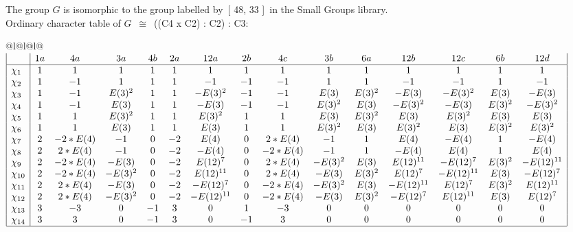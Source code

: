 \documentclass[varwidth=\maxdimen,border=10]{standalone}
\begin{document}
The group $G$ is isomorphic to the group labelled by\ [ 48, 33 ]\ in the Small Groups library.\\
Ordinary character table of $G$\ $\cong$\ ((C4 x C2) : C2) : C3:\\
\begin{center}
\begin{tabular}{@{}l@{}l@{}l@{}}
\hline
\(\begin{array}{|l|cccccccccccccc|}
  & 1a & 4a & 3a & 4b & 2a & 12a & 2b & 4c & 3b & 6a & 12b & 12c & 6b & 12d\\ \hline
\chi_{1} & 1 & 1 & 1 & 1 & 1 & 1 & 1 & 1 & 1 & 1 & 1 & 1 & 1 & 1\\
\chi_{2} & 1 & -1 & 1 & 1 & 1 & -1 & -1 & -1 & 1 & 1 & -1 & -1 & 1 & -1\\
\chi_{3} & 1 & -1 & E(3)^{2} & 1 & 1 & -E(3)^{2} & -1 & -1 & E(3) & E(3)^{2} & -E(3) & -E(3)^{2} & E(3) & -E(3)\\
\chi_{4} & 1 & -1 & E(3) & 1 & 1 & -E(3) & -1 & -1 & E(3)^{2} & E(3) & -E(3)^{2} & -E(3) & E(3)^{2} & -E(3)^{2}\\
\chi_{5} & 1 & 1 & E(3)^{2} & 1 & 1 & E(3)^{2} & 1 & 1 & E(3) & E(3)^{2} & E(3) & E(3)^{2} & E(3) & E(3)\\
\chi_{6} & 1 & 1 & E(3) & 1 & 1 & E(3) & 1 & 1 & E(3)^{2} & E(3) & E(3)^{2} & E(3) & E(3)^{2} & E(3)^{2}\\
\chi_{7} & 2 & -2*E(4) & -1 & 0 & -2 & E(4) & 0 & 2*E(4) & -1 & 1 & E(4) & -E(4) & 1 & -E(4)\\
\chi_{8} & 2 & 2*E(4) & -1 & 0 & -2 & -E(4) & 0 & -2*E(4) & -1 & 1 & -E(4) & E(4) & 1 & E(4)\\
\chi_{9} & 2 & -2*E(4) & -E(3) & 0 & -2 & E(12)^{7} & 0 & 2*E(4) & -E(3)^{2} & E(3) & E(12)^{11} & -E(12)^{7} & E(3)^{2} & -E(12)^{11}\\
\chi_{10} & 2 & -2*E(4) & -E(3)^{2} & 0 & -2 & E(12)^{11} & 0 & 2*E(4) & -E(3) & E(3)^{2} & E(12)^{7} & -E(12)^{11} & E(3) & -E(12)^{7}\\
\chi_{11} & 2 & 2*E(4) & -E(3) & 0 & -2 & -E(12)^{7} & 0 & -2*E(4) & -E(3)^{2} & E(3) & -E(12)^{11} & E(12)^{7} & E(3)^{2} & E(12)^{11}\\
\chi_{12} & 2 & 2*E(4) & -E(3)^{2} & 0 & -2 & -E(12)^{11} & 0 & -2*E(4) & -E(3) & E(3)^{2} & -E(12)^{7} & E(12)^{11} & E(3) & E(12)^{7}\\
\chi_{13} & 3 & -3 & 0 & -1 & 3 & 0 & 1 & -3 & 0 & 0 & 0 & 0 & 0 & 0\\
\chi_{14} & 3 & 3 & 0 & -1 & 3 & 0 & -1 & 3 & 0 & 0 & 0 & 0 & 0 & 0\\
\hline
\end{array}\)\\
\end{tabular}
\end{center}
\end{document}
